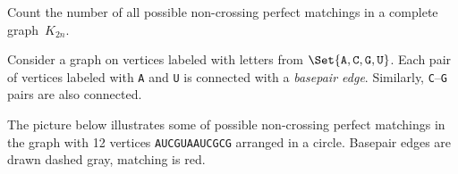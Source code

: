 \documentclass[a4paper,12pt]{article}
\begin{document}
\begin{tasks}
    \begin{subtasks}
        \item Count the number of all possible non-crossing perfect matchings in a complete graph~$K_{2n}$.

        \item Consider a graph on vertices labeled with letters from $\Set{\texttt{A}, \texttt{C}, \texttt{G}, \texttt{U}}$.
        Each pair of vertices labeled with \texttt{A} and \texttt{U} is connected with a \emph{basepair edge}.
        Similarly, \texttt{C}--\texttt{G} pairs are also connected.

        The picture below illustrates some of possible non-crossing perfect matchings in the graph with 12 vertices \texttt{AUCGUAAUCGCG} arranged in a circle.
        Basepair edges are drawn dashed gray, matching is red.


\end{subtasks}
\end{tasks}
\end{document}
